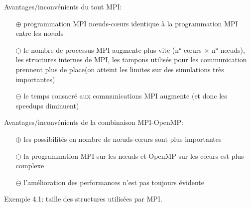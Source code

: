 \documentclass{beamer}
\begin{document}
\begin{frame}
	
\vfill

Avantages/inconvénients du tout MPI:
	
\vfill
\begin{itemize}
	\item[\LARGE $\mathbf\oplus$] programmation MPI n\oe uds-c\oe urs identique à la programmation MPI entre les n\oe uds
	
\vfill
	\item[\LARGE $\mathbf\ominus$] le nombre de processus MPI augmente plus vite (n° c\oe urs $\times$ n° n\oe uds), les structures internes de MPI, les tampons utilisés pour les communication prennent plus de place(on atteint les limites sur des simulations très importantes)
	
\vfill
	\item[\LARGE $\mathbf\ominus$] le temps consacré aux communications MPI augmente (et donc les speedups diminuent)
\end{itemize}
\vfill
\end{frame}

\begin{frame}


\vfill
	Avantages/inconvénients de la combinaison MPI-OpenMP:
	
\vfill
	\begin{itemize}
		\item[\LARGE $\mathbf\oplus$] les possibilités en nombre de n\oe uds-c\oe urs sont plus importantes
	
\vfill
		\item[\LARGE $\mathbf\ominus$] la programmation MPI sur les n\oe uds et OpenMP sur les c\oe urs est plus complexe
	
\vfill
		\item[\LARGE $\mathbf\ominus$] l'amélioration des performances n'est pas toujours évidente
	\end{itemize}
	
	\vfill
\end{frame}

\begin{frame}
	Exemple 4.1: taille des structures utilisées par MPI.
\end{frame}
\end{document}

